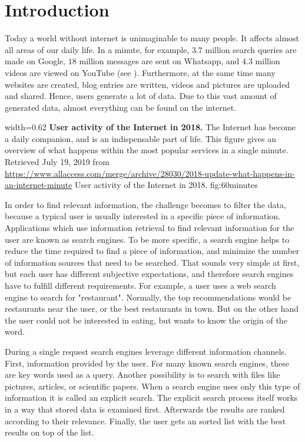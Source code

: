 \chapter{Introduction}
\label{cha:introduction}

Today a world without internet is unimaginable to many people. It affects almost all areas of our daily life. In a minute, for example, $3.7$ million search queries are made on Google, $18$ million messages are sent on Whatsapp, and $4.3$ million videos are viewed on YouTube (see ). Furthermore, at the same time many websites are created, blog entries are written, videos and pictures are uploaded and shared. Hence, users generate a lot of data. Due to this vast amount of generated data, almost everything can be found on the internet.

      {width=0.62\textwidth}
      {\textbf{User activity of the Internet in 2018.} The Internet has become a daily companion, and is an indispensable part of life. This figure gives an overview of what happens within the most popular services in a single minute. Retrieved July 19, 2019 from \url{https://www.allaccess.com/merge/archive/28030/2018-update-what-happens-in-an-internet-minute}}
      {User activity of the Internet in 2018.}
      {fig:60minutes}

In order to find relevant information, the challenge becomes to filter the data, because a typical user is usually interested in a specific piece of information. Applications which use information retrieval to find relevant information for the user are known as search engines. To be more specific, a search engine helps to reduce the time required to find a piece of information, and minimize the number of information sources that need to be searched. That sounds very simple at first, but each user has different subjective expectations, and therefore search engines have to fulfill different requirements. For example, a user uses a web search engine to search for "restaurant". Normally, the top recommendations would be restaurants near the user, or the best restaurants in town. But on the other hand the user could not be interested in eating, but wants to know the origin of the word.

During a single request search engines leverage different information channels. First, information provided by the user. For many known search engines, these are key words used as a query. Another possibility is to search with files like pictures, articles, or scientific papers. When a search engine uses only this type of information it is called an explicit search. The explicit search process itself works in a way that stored data is examined first. Afterwards the results are ranked according to their relevance. Finally, the user gets an sorted list with the best results on top of the list.

